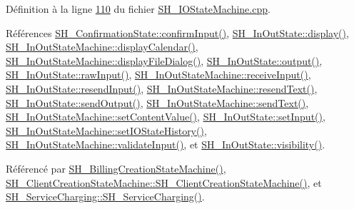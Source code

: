 Définition à la ligne \hyperlink{SH__IOStateMachine_8cpp_source_l00110}{110} du fichier \hyperlink{SH__IOStateMachine_8cpp_source}{S\-H\-\_\-\-I\-O\-State\-Machine.\-cpp}.



Références \hyperlink{classSH__ConfirmationState_ae47d89a7fc0ada8eb51d8bef2317b348}{S\-H\-\_\-\-Confirmation\-State\-::confirm\-Input()}, \hyperlink{classSH__InOutState_a918e8a7f5fe00dc16004e46eeee1281d}{S\-H\-\_\-\-In\-Out\-State\-::display()}, \hyperlink{classSH__InOutStateMachine_a0d241868828cbf9798233a8c74c69851}{S\-H\-\_\-\-In\-Out\-State\-Machine\-::display\-Calendar()}, \hyperlink{classSH__InOutStateMachine_aeddfbc098f5ee8ac05eadbaf37803fb1}{S\-H\-\_\-\-In\-Out\-State\-Machine\-::display\-File\-Dialog()}, \hyperlink{classSH__InOutState_a1a2fd4f34484125058e20730aaee7e46}{S\-H\-\_\-\-In\-Out\-State\-::output()}, \hyperlink{classSH__InOutState_a4b1ca094de91c47690ec2d1e95678273}{S\-H\-\_\-\-In\-Out\-State\-::raw\-Input()}, \hyperlink{classSH__InOutStateMachine_ab224e4a6ab99c15770bc63e1b8fdb771}{S\-H\-\_\-\-In\-Out\-State\-Machine\-::receive\-Input()}, \hyperlink{classSH__InOutState_afa791181eb61a18d4337a04827f9b200}{S\-H\-\_\-\-In\-Out\-State\-::resend\-Input()}, \hyperlink{classSH__InOutStateMachine_a526822c66b46aa0cd81ba4473fa5573f}{S\-H\-\_\-\-In\-Out\-State\-Machine\-::resend\-Text()}, \hyperlink{classSH__InOutState_ad40e929a5537eb1d4883d5aa6eee5b15}{S\-H\-\_\-\-In\-Out\-State\-::send\-Output()}, \hyperlink{classSH__InOutStateMachine_ae2cbbe3cd207158668dcb4838938c7ad}{S\-H\-\_\-\-In\-Out\-State\-Machine\-::send\-Text()}, \hyperlink{classSH__InOutStateMachine_aa2766b7a7ba39c35a10df7fc0c151b4f}{S\-H\-\_\-\-In\-Out\-State\-Machine\-::set\-Content\-Value()}, \hyperlink{classSH__InOutState_a0206ab7d5616f28b0da7bfd5451614e8}{S\-H\-\_\-\-In\-Out\-State\-::set\-Input()}, \hyperlink{classSH__InOutStateMachine_a4b72e6da839782a211692a4d728c3925}{S\-H\-\_\-\-In\-Out\-State\-Machine\-::set\-I\-O\-State\-History()}, \hyperlink{classSH__InOutStateMachine_a5a5804bd32a04d25926f6e323b906887}{S\-H\-\_\-\-In\-Out\-State\-Machine\-::validate\-Input()}, et \hyperlink{classSH__InOutState_a8c496b2fe21a51a587c6e4409c0f37ec}{S\-H\-\_\-\-In\-Out\-State\-::visibility()}.



Référencé par \hyperlink{classSH__BillingCreationStateMachine_ad62b77fa4aeafe200056ff3974562f83}{S\-H\-\_\-\-Billing\-Creation\-State\-Machine()}, \hyperlink{classSH__ClientCreationStateMachine_a0b406b0f404c0fd33bf35be8ce0cc811}{S\-H\-\_\-\-Client\-Creation\-State\-Machine\-::\-S\-H\-\_\-\-Client\-Creation\-State\-Machine()}, et \hyperlink{classSH__ServiceCharging_afa5273d046049b1c2b020a6a19a8290b}{S\-H\-\_\-\-Service\-Charging\-::\-S\-H\-\_\-\-Service\-Charging()}.


